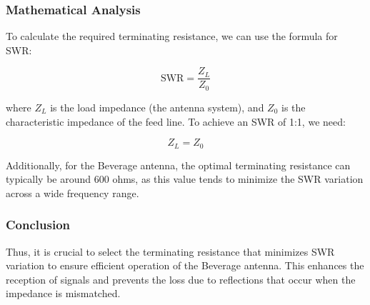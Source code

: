 \subsubsection{Mathematical Analysis}

To calculate the required terminating resistance, we can use the formula for SWR:

\[
\text{SWR} = \frac{Z_L}{Z_0}
\]

where \( Z_L \) is the load impedance (the antenna system), and \( Z_0 \) is the characteristic impedance of the feed line. To achieve an SWR of 1:1, we need:

\[
Z_L = Z_0
\]

Additionally, for the Beverage antenna, the optimal terminating resistance can typically be around 600 ohms, as this value tends to minimize the SWR variation across a wide frequency range.

\subsubsection{Conclusion}

Thus, it is crucial to select the terminating resistance that minimizes SWR variation to ensure efficient operation of the Beverage antenna. This enhances the reception of signals and prevents the loss due to reflections that occur when the impedance is mismatched.

